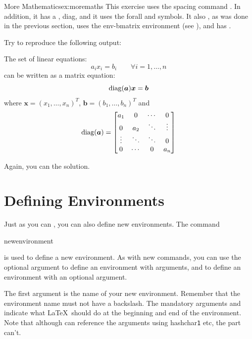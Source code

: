 \begin{exercise}{More Mathematics}{ex:moremaths}
This exercise uses the spacing command . In addition,
it has a
, diag, and it uses the
\gls{forall} and  symbols. It also
, as was done in the previous
section, uses the
\gls{env-bmatrix} environment (see ), and has .

Try to reproduce the following output:
\begin{result}
\renewcommand{\vec}[1]{\boldsymbol{#1}}
The set of linear equations:
\[
a_ix_i = b_i  \qquad \forall i=1, \ldots, n
\]
can be written as a matrix equation:
\[
\diag(\vec{a})\vec{x} = \vec{b}
\]
where $\vec{x} = (x_1, \ldots, x_n)^T$, $\vec{b} = (b_1, \ldots, b_n)^T$
and
\[
\diag(\vec{a}) = 
\begin{bmatrix}
a_1 & 0 & \cdots & 0\\
0 & a_2 & \ddots & \vdots\\
\vdots & \ddots & \ddots & 0\\
0 & \cdots & 0 & a_n
\end{bmatrix}
\]
\end{result}

Again, you can  the solution.
\end{exercise}


\chapter{Defining Environments}
\label{ch:newenv}

Just as you can , you can 
also define new \glspl{environment}.  The command
\begin{definition}
\gls{newenvironment}
\end{definition}%
is used to define a new environment. As with new commands, you can
use the optional argument  to define an environment with
arguments, and  to define an environment with an
optional argument.

The first argument  is the name of your new
environment.  Remember that the environment name must not have a
backslash.  The mandatory arguments  and
 indicate what \LaTeX\ \reportlinebreak should do at the beginning and
end of the environment. Note that although  can
reference the arguments using \gls{hashchar}\texttt{1} etc, the
 part can't.

